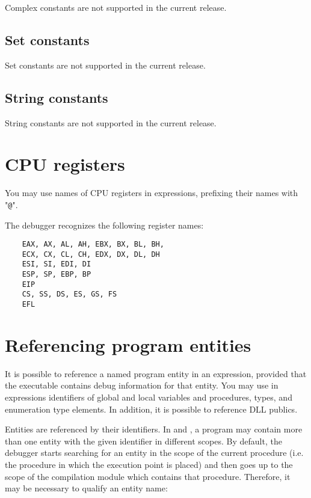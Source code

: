 Complex constants are not supported in the current release.

\subsection{Set constants}

Set constants are not supported in the current release.

\subsection{String constants}

String constants are not supported in the current release.

\fi

\section{CPU registers}

You may use names of CPU registers in expressions, prefixing their names
with "\verb'@'".

The debugger recognizes the following register names:

\begin{verbatim}
    EAX, AX, AL, AH, EBX, BX, BL, BH,
    ECX, CX, CL, CH, EDX, DX, DL, DH
    ESI, SI, EDI, DI
    ESP, SP, EBP, BP
    EIP
    CS, SS, DS, ES, GS, FS
    EFL
\end{verbatim}

\section{Referencing program entities}
\label{expr:entities}

It is possible to reference a named program entity in an expression, 
provided that the executable contains debug information for that entity.
You may use in expressions identifiers of global and local variables 
and procedures, types, and enumeration type elements. In addition, 
it is possible to reference DLL publics.

Entities are referenced by their identifiers. In \mt{} and \ot{}, a program
may contain more than one entity with the given identifier in different scopes.
By default, the debugger starts searching for an entity in the scope of 
the current procedure (i.e. the procedure in which the execution point 
is placed) and then goes up to the scope of the compilation module which 
contains that procedure. Therefore, it may be necessary to qualify an 
entity name:

